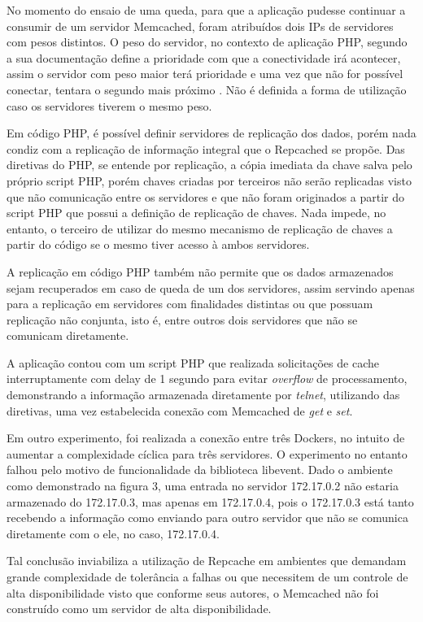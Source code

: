 \documentclass[conference]{IEEEtran}
\begin{document}
No momento do ensaio de uma queda, para que a aplicação pudesse continuar a consumir de um servidor Memcached, foram atribuídos dois IPs de servidores com pesos distintos. O peso do servidor, no contexto de aplicação PHP, segundo a sua documentação define a prioridade com que a conectividade irá acontecer, assim o servidor com peso maior terá prioridade e uma vez que não for possível conectar, tentara o segundo mais próximo \cite{phpmemcachedserver}. Não é definida a forma de utilização caso os servidores tiverem o mesmo peso.

Em código PHP, é possível definir servidores de replicação dos dados, porém nada condiz com a replicação de informação integral que o Repcached se propõe. Das diretivas do PHP, se entende por replicação, a cópia imediata da chave salva pelo próprio script PHP, porém chaves criadas por terceiros não serão replicadas visto que não comunicação entre os servidores e que não foram originados a partir do script PHP que possui a definição de replicação de chaves. Nada impede, no entanto, o terceiro de utilizar do mesmo mecanismo de replicação de chaves a partir do código se o mesmo tiver acesso à ambos servidores.

A replicação em código PHP também não permite que os dados armazenados sejam recuperados em caso de queda de um dos servidores, assim servindo apenas para a replicação em servidores com finalidades distintas ou que possuam replicação não conjunta, isto é, entre outros dois servidores que não se comunicam diretamente.

A aplicação contou com um script PHP que realizada solicitações de cache interruptamente com delay de 1 segundo para evitar \textit{overflow} de processamento, demonstrando a informação armazenada diretamente por \textit{telnet}, utilizando das diretivas, uma vez estabelecida conexão com Memcached de \textit{get} e \textit{set}.

Em outro experimento, foi realizada a conexão entre três Dockers, no intuito de aumentar a complexidade cíclica para três servidores. O experimento no entanto falhou pelo motivo de funcionalidade da biblioteca libevent. Dado o ambiente como demonstrado na figura 3, uma entrada no servidor 172.17.0.2 não estaria armazenado do 172.17.0.3, mas apenas em 172.17.0.4, pois o 172.17.0.3 está tanto recebendo a informação como enviando para outro servidor que não se comunica diretamente com o ele, no caso, 172.17.0.4. 

Tal conclusão inviabiliza a utilização de Repcache em ambientes que demandam grande complexidade de tolerância a falhas ou que necessitem de um controle de alta disponibilidade visto que conforme seus autores, o Memcached não foi construído como um servidor de alta disponibilidade.
\end{document}
